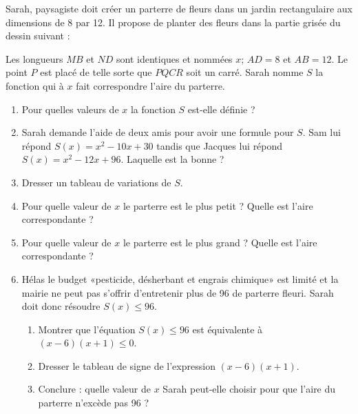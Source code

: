 
\begin{exercice}\label{exosmath-0715}

    \begin{multicols}{2}

    Sarah, paysagiste doit créer un parterre de fleurs dans un jardin rectangulaire aux dimensions de \unit{8}{\meter} par \unit{12}{\meter}. Il propose de planter des fleurs dans la partie grisée du dessin suivant :

\begin{center}
   
\end{center}

Les longueurs \( MB\) et \( ND\) sont identiques et nommées \( x\); \( AD=8\) et \( AB=12\). Le point \( P\) est placé de telle sorte que \( PQCR\) soit un carré. Sarah nomme \( S\) la fonction qui à \( x\) fait correspondre l'aire du parterre.

\begin{enumerate}
    \item
        Pour quelles valeurs de \( x\) la fonction \( S\) est-elle définie ?
    \item
        Sarah demande l'aide de deux amis pour avoir une formule pour \( S\). Sam lui répond \( S(x)=x^2-10x+30\) tandis que Jacques lui répond \( S(x)=x^2-12x+96\). Laquelle est la bonne ?
            \item
                Dresser un tableau de variations de \( S\).
            \item
                Pour quelle valeur de \( x\) le parterre est le plus petit ? Quelle est l'aire correspondante ?
            \item
                Pour quelle valeur de \( x\) le parterre est le plus grand ? Quelle est l'aire correspondante ?
    \item
        Hélas le budget «pesticide, désherbant et engrais chimique» est limité et la mairie ne peut pas s'offrir d'entretenir plus de \unit{96}{\squared\meter} de parterre fleuri. Sarah doit donc résoudre \( S(x)\leq 96\).
        \begin{enumerate}
            \item
                Montrer que l'équation \( S(x)\leq 96\) est équivalente à \( (x-6)(x+1)\leq 0\).
            \item
                Dresser le tableau de signe de l'expression \( (x-6)(x+1)\).
            \item
                Conclure : quelle valeur de \( x\) Sarah peut-elle choisir pour que l'aire du parterre n'excède pas \unit{96}{\squared\meter} ?
        \end{enumerate}
\end{enumerate}
    \end{multicols}

\end{exercice}
